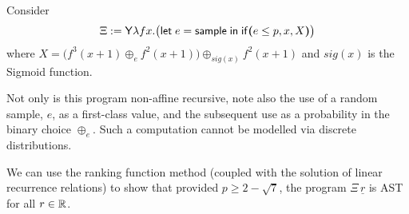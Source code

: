 \begin{example}
\label{ex:non-affine with continuous distribution}
Consider 
\[
\Xi := \mathsf{Y} \lambda f x . \big(\mathsf{let} \; e = \mathsf{sample} \; \mathsf{in} \;
\mathsf{if}\boldsymbol{(}e \leq p, x, X\boldsymbol{)}\big)
\]
where
\(
X = \big( f^3(x+1) \oplus_e f^2(x+1) \big) \oplus_{\mathit{sig}(x)} f^2(x+1) 
\)
and $\mathit{sig}(x)$ is the Sigmoid function.

Not only is this program non-affine recursive,
note also the use of a random sample, $e$, as a first-class value, and the subsequent use as a probability in the binary choice $\oplus_e$.
Such a computation cannot be modelled via discrete distributions. 

We can use the ranking function method (coupled with the solution of linear recurrence relations) to show that provided $p \geq 2 - \sqrt{7}$, the program $\Xi \, \underline r$ is AST for all $r \in \mathbb{R}$.

\end{example}


\iffalse
\[\begin{array}{l}
\mathsf{let} \; \mathit{add} \; x \; y = x + y \\
\mathsf{letrec} \; \mathit{iter} \; f \; s \; n = 
\tif{n \leq 0}{s}{f \; n \; (\mathit{iter} \; f \; s \; (n - 1)}
\end{array}
\]
\fi


